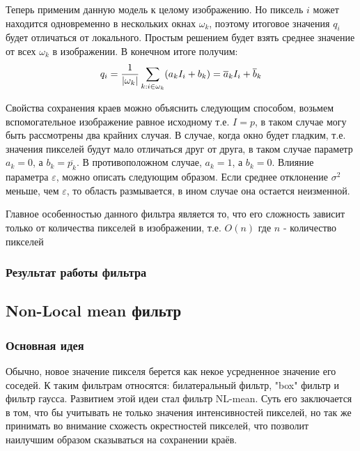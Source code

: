 Теперь применим данную модель к целому изображению. Но пиксель $i$ может находится одновременно в нескольких окнах $\omega_k$, поэтому итоговое значения $q_i$ будет отличаться от локального. Простым решением будет взять среднее значение от всех $\omega_k$ в изображении. В конечном итоге получим:
\begin{equation}
	q_i=\frac{1}{|\omega_k|}\sum_{k:i\in \omega_k}(a_kI_i+b_k)\\
	= \overline{a}_kI_i+\overline{b}_k
\end{equation}


Свойства сохранения краев можно объяснить следующим способом, возьмем вспомогательное изображение равное исходному т.е. $I=p$, в таком случае могу быть рассмотрены два крайних случая.
В случае, когда  окно будет гладким, т.е. значения пикселей будут мало отличаться друг от друга, в таком случае параметр $a_k=0$, а $b_k=\overline{p_k}$. 
В противоположном случае, $a_k=1$, а $b_k=0$.
Влияние параметра $\varepsilon$, можно описать следующим образом. Если среднее отклонение $\sigma^2$ меньше, чем $\varepsilon$, то область размывается, в ином случае она остается неизменной.

Главное особенностью данного фильтра является то, что его сложность зависит только от количества пикселей в изображении, т.е. $O(n)$ где $n$ - количество пикселей
\subsubsection{Результат работы фильтра}

\begin{figure}[H]\label{img:guidRes}
	\begin{minipage}[H]{0.49\linewidth}
	\end{minipage}
	\begin{minipage}[H]{0.49\linewidth}
	\end{minipage}
\end{figure}

\subsection{Non-Local mean фильтр}
\subsubsection{Основная идея}
Обычно, новое значение пикселя берется как некое усредненное значение его соседей. К таким фильтрам относятся: билатеральный фильтр, "box" фильтр и фильтр гаусса. Развитием этой идеи стал фильтр NL-mean. Суть его заключается в том, что бы учитывать не только значения интенсивностей пикселей, но так же принимать во внимание схожесть окрестностей пикселей, что позволит наилучшим образом сказываться на сохранении краёв. 
